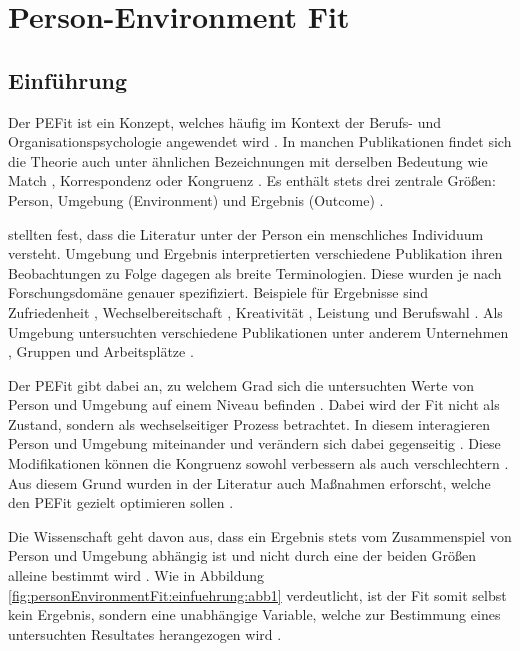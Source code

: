 \chapter{Person-Environment Fit}
\label{ch:personEnvironmentFit}

\section{Einführung}
\label{ch:personEnvironmentFit:einfuehrung}
Der \ac{PEFit} \cite[S. 428]{dawis:2002} ist ein Konzept, welches häufig im Kontext der Berufs- und Organisationspsychologie angewendet wird \cite[S. 2]{guan:2021}. In manchen Publikationen findet sich die Theorie auch unter ähnlichen Bezeichnungen mit derselben Bedeutung wie Match \cite[S. 2]{player:2017}, Korrespondenz \cite[S. 1]{eggerth:2008} oder Kongruenz \cite[S. 1]{muchinsky:1987}. Es enthält stets drei zentrale Größen: Person, Umgebung (Environment) und Ergebnis (Outcome) \cite[S. 2f.]{livingstone:1997}.

\textcite[S. 5]{edwards:2007} stellten fest, dass die Literatur unter der Person ein menschliches Individuum versteht. Umgebung und Ergebnis interpretierten verschiedene Publikation ihren Beobachtungen zu Folge dagegen als breite Terminologien. Diese wurden je nach Forschungsdomäne genauer spezifiziert. Beispiele für Ergebnisse sind Zufriedenheit \cite[S. 1]{lashani:2021}, Wechselbereitschaft \cite[S. 1]{amarneh:2021}, Kreativität \cite[S. 1]{duan:2019}, Leistung \cite[S. 7f.]{elfenbein:2007} und  Berufswahl \cite[S. 1]{cable:1996}. Als Umgebung untersuchten verschiedene Publikationen unter anderem Unternehmen \cite[S. 1]{kristof:1996}, Gruppen \cite[S. 1]{werbel:2001} und Arbeitsplätze \cite[S. 1]{lu:2014}. 

Der \ac{PEFit} gibt dabei an, zu welchem Grad sich die untersuchten Werte von Person und Umgebung auf einem Niveau befinden \cite[S. 3]{chatman:1989}. Dabei wird der Fit nicht als Zustand, sondern als wechselseitiger Prozess betrachtet. In diesem interagieren Person und Umgebung miteinander und verändern sich dabei gegenseitig \cite[S. 21f.]{roberts:2006}. Diese Modifikationen können die Kongruenz sowohl verbessern als auch verschlechtern \cite[S. 4]{caplan:1987}. Aus diesem Grund wurden in der Literatur auch Maßnahmen erforscht, welche den \ac{PEFit} gezielt optimieren sollen \cite[S. 16]{cable:2001}.

Die Wissenschaft geht davon aus, dass ein Ergebnis stets vom Zusammenspiel von Person und Umgebung abhängig ist und nicht durch eine der beiden Größen alleine bestimmt wird \cite[S. 1]{muchinsky:1987}. Wie in Abbildung \ref{fig:personEnvironmentFit:einfuehrung:abb1} verdeutlicht, ist der Fit somit selbst kein Ergebnis, sondern eine unabhängige Variable, welche zur Bestimmung eines untersuchten Resultates herangezogen wird \cite[S. 4f.]{edwards:1991}.

